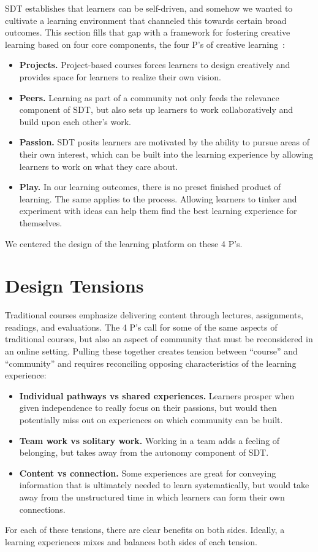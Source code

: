 \documentclass[12pt,twoside]{mitthesis}
\begin{document}
SDT establishes that learners can be self-driven, and somehow we wanted to cultivate a learning environment that channeled this towards certain broad outcomes. This section fills that gap with a framework for fostering creative learning based on four core components, the four P's of creative learning~\cite{cultivating}\cite{resnick2014give}\cite{creativelearningfuturework}:
\begin{itemize}
\item \textbf{Projects.} Project-based courses forces learners to design creatively and provides space for learners to realize their own vision.
\item \textbf{Peers.} Learning as part of a community not only feeds the relevance component of SDT, but also sets up learners to work collaboratively and build upon each other's work.
\item \textbf{Passion.} SDT posits learners are motivated by the ability to pursue areas of their own interest, which can be built into the learning experience by allowing learners to work on what they care about.
\item \textbf{Play.} In our learning outcomes, there is no preset finished product of learning. The same applies to the process. Allowing learners to tinker and experiment with ideas can help them find the best learning experience for themselves.
\end{itemize}
We centered the design of the learning platform on these 4 P's.

\section{Design Tensions}

Traditional courses emphasize delivering content through lectures, assignments, readings, and evaluations. The 4 P's call for some of the same aspects of traditional courses, but also an aspect of community that must be reconsidered in an online setting. Pulling these together creates tension between ``course'' and ``community'' and requires reconciling opposing characteristics of the learning experience:
\begin{itemize}
\item \textbf{Individual pathways vs shared experiences.} Learners prosper when given independence to really focus on their passions, but would then potentially miss out on experiences on which community can be built. 
\item \textbf{Team work vs solitary work.} Working in a team adds a feeling of belonging, but takes away from the autonomy component of SDT.
\item \textbf{Content vs connection.} Some experiences are great for conveying information that is ultimately needed to learn systematically, but would take away from the unstructured time in which learners can form their own connections.
\end{itemize} 
For each of these tensions, there are clear benefits on both sides. Ideally, a learning experiences mixes and balances both sides of each tension.\cite{learningcreativelearning} 
\end{document}
